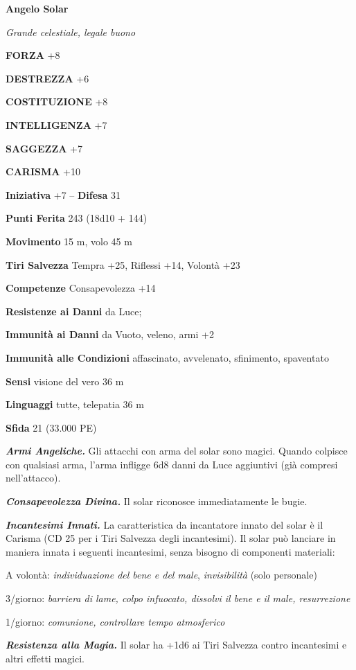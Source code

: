 \begin{multicols}{2}
\medskip{}\textbf{Angelo Solar}

\emph{Grande celestiale, legale buono}

\textbf{FORZA} +8

\textbf{DESTREZZA} +6

\textbf{COSTITUZIONE} +8

\textbf{INTELLIGENZA} +7

\textbf{SAGGEZZA} +7

\textbf{CARISMA} +10

\textbf{Iniziativa} +7 -- \textbf{Difesa} 31

\textbf{Punti Ferita} 243 (18d10 + 144) 

\textbf{Movimento} 15 m, volo 45 m

\textbf{Tiri Salvezza} Tempra +25, Riflessi +14, Volontà +23

\textbf{Competenze} Consapevolezza +14

\textbf{Resistenze ai Danni} da Luce;

\textbf{Immunità ai Danni} da Vuoto, veleno, armi +2

\textbf{Immunità alle Condizioni} affascinato, avvelenato, sfinimento, spaventato

\textbf{Sensi} visione del vero 36 m

\textbf{Linguaggi} tutte, telepatia 36 m 

\textbf{Sfida} 21 (33.000 PE)

\emph{\textbf{Armi Angeliche.}} Gli attacchi con arma del solar sono magici. Quando colpisce con qualsiasi arma, l'arma infligge 6d8 danni da Luce aggiuntivi (già compresi nell'attacco).

\emph{\textbf{Consapevolezza Divina.}} Il solar riconosce immediatamente le bugie.

\emph{\textbf{Incantesimi Innati.}} La caratteristica da incantatore innato del solar è il Carisma (CD 25 per i Tiri Salvezza degli incantesimi). Il solar può lanciare in maniera innata i seguenti incantesimi, senza bisogno di componenti materiali:

A volontà: \emph{individuazione del bene e del male}, \emph{invisibilità} (solo personale)

3/giorno: \emph{barriera di lame, colpo infuocato, dissolvi il bene e il male, resurrezione}

1/giorno: \emph{comunione, controllare tempo atmosferico}

\emph{\textbf{Resistenza alla Magia.}} Il solar ha +1d6 ai Tiri Salvezza contro incantesimi e altri effetti magici.


\end{multicols}
